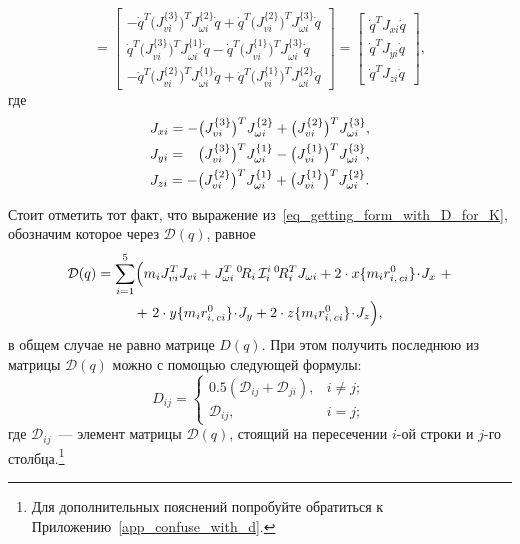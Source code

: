 \begin{equation}
    =
    \begin{bmatrix}
        -\dot{q}^T \bigl(J_{vi}^{\{3\}} \bigr)^T J_{\omega i}^{\{2\}} \dot{q} +
        \dot{q}^T \bigl( J_{vi}^{\{2\}} \bigr)^T J_{\omega i}^{\{3\}} \dot{q}
        \\
        \dot{q}^T \bigl( J_{vi}^{\{3\}} \bigr)^T J_{\omega i}^{\{1\}} \dot{q} -
        \dot{q}^T \bigl( J_{vi}^{\{1\}} \bigr)^T J_{\omega i}^{\{3\}} \dot{q}
        \\
        -\dot{q}^T \bigl( J_{vi}^{\{2\}} \bigr)^T J_{\omega i}^{\{1\}} \dot{q} +
        \dot{q}^T \bigl( J_{vi}^{\{1\}} \bigr)^T J_{\omega i}^{\{2\}} \dot{q}
    \end{bmatrix}
    =
    \begin{bmatrix}
        \dot{q}^T \! J_{xi} \dot{q} \\
        \dot{q}^T \! J_{yi} \dot{q} \\
        \dot{q}^T \! J_{zi} \dot{q}
    \end{bmatrix}\!\!,
\end{equation}
где
\begin{align}
    &J_{xi} =  - \bigl( J_{vi}^{\{3\}} \bigr)^T J_{\omega i}^{\{2\}} + \bigl( J_{vi}^{\{2\}} \bigr)^T J_{\omega i}^{\{3\}}, \\
    &J_{yi} = \phantom{-}\bigl( J_{vi}^{\{3\}} \bigr)^T J_{\omega i}^{\{1\}} - \bigl( J_{vi}^{\{1\}} \bigr)^T J_{\omega i}^{\{3\}}, \\
    &J_{zi} =  - \bigl( J_{vi}^{\{2\}} \bigr)^T J_{\omega i}^{\{1\}} + \bigl( J_{vi}^{\{1\}} \bigr)^T J_{\omega i}^{\{2\}} \ldotp
\end{align}

Стоит отметить тот факт, что выражение из~\eqref{eq_getting_form_with_D_for_K}, обозначим которое через $\mathcal{D}(q)$, равное
\begin{gather}
    \mathcal{D}(q) = \sum_{i=1}^5 \Bigl(m_i J_{vi}^T J_{vi} + J_{\omega i}^T \, {}^0\!R_i \, \mathcal{I}^{i}_i \, {}^0\!R_i^T J_{\omega i} + 2 \cdot x\{ m_i r^0_{i,\,ci} \} \!\cdot\! J_{x} \,\, + \notag \\
    + \,\, 2 \cdot y\{ m_i r^0_{i,\,ci} \} \!\cdot\! J_{y} + 2 \cdot z\{ m_i r^0_{i,\,ci} \} \!\cdot\! J_{z}\Bigr),
\end{gather}
в общем случае не равно матрице $D(q)$.
При этом получить последнюю из матрицы $\mathcal{D}(q)$ можно с помощью следующей формулы:
\begin{equation}
    D_{ij} =
    \begin{cases}
        0.5 (\mathcal{D}_{ij} + \mathcal{D}_{ji}), & i \ne j; \\
        \mathcal{D}_{ij}, & i = j;
    \end{cases}
\end{equation}
где $\mathcal{D}_{ij}$~--- элемент матрицы $\mathcal{D}(q)$, стоящий на пересечении $i$-ой строки и $j$-го столбца\lefteqn.\footnote{Для дополнительных пояснений попробуйте обратиться к Приложению~\ref{app_confuse_with_d}.}

\newpage
